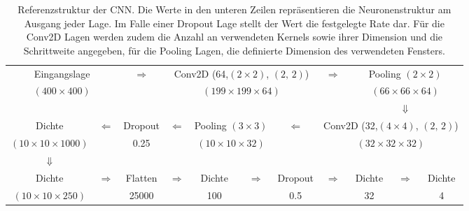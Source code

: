 \begin{table}[!t]
\centering
\footnotesize
 \begin{tabular}{|c|c|c|c|c|c|c|c|c|c|c|}
 \cline{1-2} \cline{4-7} \cline{9-11}
 \multicolumn{2}{|c|}{Eingangslage} & \multirow{2}{*}{$\Rightarrow$} & \multicolumn{4}{c|}{Conv2D (64,$(2\times 2)$, $(2,\,2)$)}&\multirow{2}{*}{$\Rightarrow$} & \multicolumn{3}{c|}{Pooling $(2\times 2)$} \\
 \cline{1-2} \cline{4-7} \cline{9-11}
 \multicolumn{2}{|c|}{$(400 \times 400)$} & & \multicolumn{4}{c|}{$(199 \times 199 \times 64)$} & & \multicolumn{3}{c|}{$(66 \times 66 \times 64)$} \\
 \cline{1-2} \cline{4-7} \cline{9-11}
 \multicolumn{8}{c}{}& \multicolumn{3}{c}{$\Downarrow$} \\
 \cline{1-1} \cline{3-3} \cline{5-6} \cline{8-11}
 Dichte & \multirow{2}{*}{$\Leftarrow$} & Dropout & \multirow{2}{*}{$\Leftarrow$} & \multicolumn{2}{c|}{Pooling $(3\times 3)$} &\multirow{2}{*}{$\Leftarrow$}  & \multicolumn{4}{c|}{Conv2D (32,$(4\times 4)$, $(2,\,2)$)} \\
 \cline{1-1} \cline{3-3} \cline{5-6} \cline{8-11}
 $(10\times 10\times 1000)$ & & 0.25 & &  \multicolumn{2}{c|}{$(10\times 10 \times 32)$} & & \multicolumn{4}{c|}{$(32 \times 32 \times 32)$} \\
 \cline{1-1} \cline{3-3} \cline{5-6} \cline{8-11}
 \multicolumn{1}{c}{ $\Downarrow$}& \multicolumn{10}{c}{} \\
  \cline{1-1} \cline{3-3} \cline{5-5} \cline{7-7} \cline{9-9} \cline{11-11}
  Dichte  & \multirow{2}{*}{$\Rightarrow$} & Flatten & \multirow{2}{*}{$\Rightarrow$} & Dichte & \multirow{2}{*}{$\Rightarrow$} & Dropout & \multirow{2}{*}{$\Rightarrow$} & Dichte & \multirow{2}{*}{$\Rightarrow$} & Dichte \\
  \cline{1-1} \cline{3-3} \cline{5-5} \cline{7-7} \cline{9-9} \cline{11-11}
  $(10\times 10\times 250)$ & &  25000 & & 100 & &0.5 & &32& & 4 \\
  \cline{1-1} \cline{3-3} \cline{5-5} \cline{7-7} \cline{9-9} \cline{11-11}
 \end{tabular}
 \caption{Referenzstruktur der CNN. Die Werte in den unteren Zeilen repräsentieren die Neuronenstruktur am Ausgang jeder Lage. Im Falle einer Dropout Lage stellt der Wert die festgelegte Rate dar. Für die Conv2D Lagen werden zudem die Anzahl an verwendeten Kernels sowie ihrer Dimension und die Schrittweite angegeben, für die Pooling Lagen, die definierte Dimension des verwendeten Fensters.}
 \label{fig:refstrukt}
\end{table}

